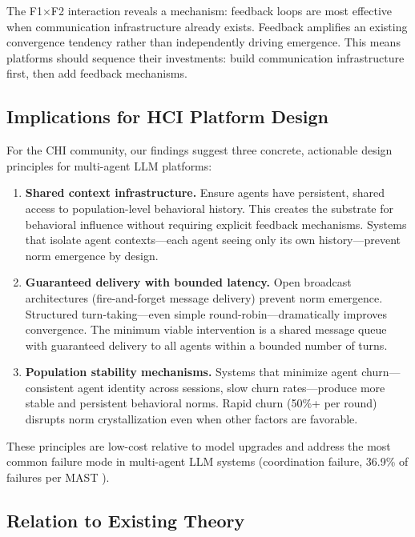 The F1$\times$F2 interaction reveals a mechanism: feedback loops are most effective when communication infrastructure already exists. Feedback amplifies an existing convergence tendency rather than independently driving emergence. This means platforms should sequence their investments: build communication infrastructure first, then add feedback mechanisms.

\subsection{Implications for HCI Platform Design}
\label{sec:hci-implications}

For the CHI community, our findings suggest three concrete, actionable design principles for multi-agent LLM platforms:

\begin{enumerate}
    \item \textbf{Shared context infrastructure.} Ensure agents have persistent, shared access to population-level behavioral history. This creates the substrate for behavioral influence without requiring explicit feedback mechanisms. Systems that isolate agent contexts—each agent seeing only its own history—prevent norm emergence by design.
    
    \item \textbf{Guaranteed delivery with bounded latency.} Open broadcast architectures (fire-and-forget message delivery) prevent norm emergence. Structured turn-taking—even simple round-robin—dramatically improves convergence. The minimum viable intervention is a shared message queue with guaranteed delivery to all agents within a bounded number of turns.
    
    \item \textbf{Population stability mechanisms.} Systems that minimize agent churn—consistent agent identity across sessions, slow churn rates—produce more stable and persistent behavioral norms. Rapid churn (50\%+ per round) disrupts norm crystallization even when other factors are favorable.
\end{enumerate}

These principles are low-cost relative to model upgrades and address the most common failure mode in multi-agent LLM systems (coordination failure, 36.9\% of failures per MAST \citep{xiao2025mast}).

\subsection{Relation to Existing Theory}
\label{sec:theory}

